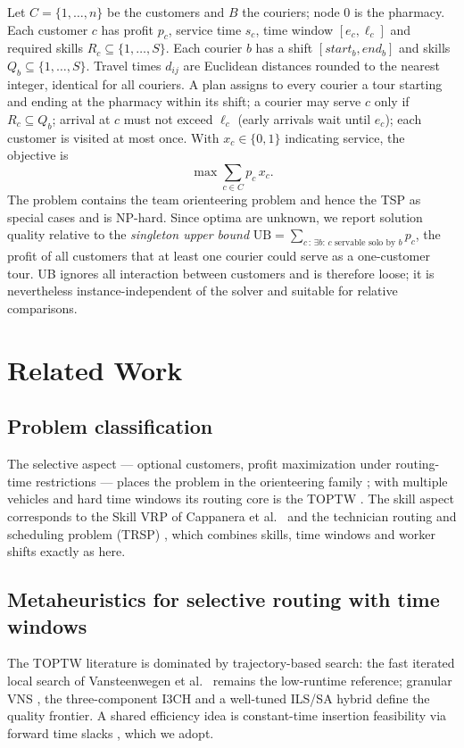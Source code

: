 \documentclass[10pt, a4paper]{article}
\begin{document}
Let $C=\{1,\dots,n\}$ be the customers and $B$ the couriers; node $0$ is the
pharmacy. Each customer $c$ has profit $p_c$, service time $s_c$, time window
$[e_c,\ell_c]$ and required skills $R_c\subseteq\{1,\dots,S\}$. Each courier
$b$ has a shift $[\mathit{start}_b,\mathit{end}_b]$ and skills
$Q_b\subseteq\{1,\dots,S\}$. Travel times $d_{ij}$ are Euclidean distances
rounded to the nearest integer, identical for all couriers. A plan assigns to
every courier a tour starting and ending at the pharmacy within its shift; a
courier may serve $c$ only if $R_c\subseteq Q_b$; arrival at $c$ must not
exceed $\ell_c$ (early arrivals wait until $e_c$); each customer is visited at
most once. With $x_c\in\{0,1\}$ indicating service, the objective is
\begin{equation}
  \max \sum_{c\in C} p_c\, x_c .
  \label{eq:objective}
\end{equation}
The problem contains the team orienteering problem and hence the TSP as
special cases and is NP-hard. Since optima are unknown, we report solution
quality relative to the \emph{singleton upper bound}
$\mathrm{UB}=\sum_{c\,:\,\exists b:\, c \text{ servable solo by } b} p_c$,
the profit of all customers that at least one courier could serve as a
one-customer tour. UB ignores all interaction between customers and is
therefore loose; it is nevertheless instance-independent of the solver and
suitable for relative comparisons.

\section{Related Work}\label{sec:related}

\subsection{Problem classification}
The selective aspect --- optional customers, profit maximization under
routing-time restrictions --- places the problem in the orienteering family
\cite{vansteenwegen2011}; with multiple vehicles and hard time windows its
routing core is the TOPTW \cite{labadie2012,gunawan2016}. The skill aspect
corresponds to the Skill VRP of Cappanera et al.~\cite{cappanera2011} and the
technician routing and scheduling problem (TRSP)
\cite{kovacs2012,pillac2013}, which combines skills, time windows and worker
shifts exactly as here.

\subsection{Metaheuristics for selective routing with time windows}
The TOPTW literature is dominated by trajectory-based search: the fast
iterated local search of Vansteenwegen et al.~\cite{vansteenwegen2009}
remains the low-runtime reference; granular VNS \cite{labadie2012}, the
three-component I3CH \cite{hu2014} and a well-tuned ILS/SA hybrid
\cite{gunawan2017} define the quality frontier. A shared efficiency idea is
constant-time insertion feasibility via forward time slacks
\cite{savelsbergh1992,vansteenwegen2009}, which we adopt.
\end{document}
